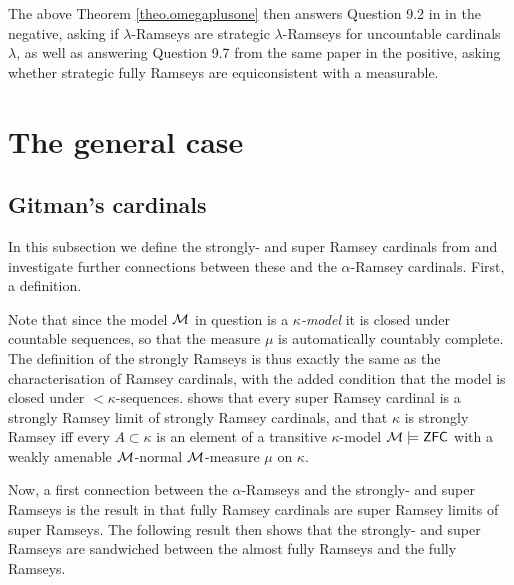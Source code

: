 \documentclass[../main]{subfiles}
\begin{document}
The above Theorem \ref{theo.omegaplusone} then answers Question 9.2 in \cite{HolySchlicht} in the negative, asking if $\lambda$-Ramseys are strategic $\lambda$-Ramseys for uncountable cardinals $\lambda$, as well as answering Question 9.7 from the same paper in the positive, asking whether strategic fully Ramseys are equiconsistent with a measurable.



\section{The general case}

\subsection*{Gitman's cardinals}

In this subsection we define the strongly- and super Ramsey cardinals from \cite{Ramsey1} and investigate further connections between these and the $\alpha$-Ramsey cardinals. First, a definition.


Note that since the model $\operatorname{\mathcal M}$ in question is a \textit{$\kappa$-model} it is closed under countable sequences, so that the measure $\mu$ is automatically countably complete. The definition of the strongly Ramseys is thus exactly the same as the characterisation of Ramsey cardinals, with the added condition that the model is closed under ${<}\kappa$-sequences. \cite{Ramsey1} shows that every super Ramsey cardinal is a strongly Ramsey limit of strongly Ramsey cardinals, and that $\kappa$ is strongly Ramsey iff every $A\subset\kappa$ is an element of a transitive $\kappa$-model $\operatorname{\mathcal M}\models\textsf{ZFC}$ with a weakly amenable $\operatorname{\mathcal M}$-normal $\operatorname{\mathcal M}$-measure $\mu$ on $\kappa$.

\qquad Now, a first connection between the $\alpha$-Ramseys and the strongly- and super Ramseys is the result in \cite{HolySchlicht} that fully Ramsey cardinals are super Ramsey limits of super Ramseys. The following result then shows that the strongly- and super Ramseys are sandwiched between the almost fully Ramseys and the fully Ramseys.
\end{document}
